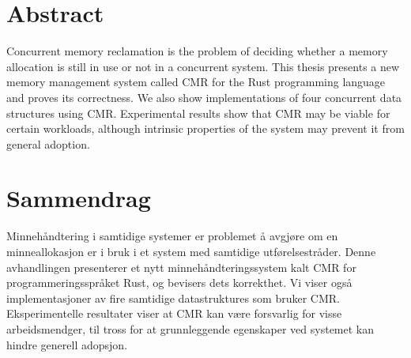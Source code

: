 \par\break\null%
\vsize%
{\centering\section*{Abstract}}

Concurrent memory reclamation is the problem of deciding whether a memory allocation is still in
use or not in a concurrent system.  This thesis presents a new memory management system called CMR
for the Rust programming language and proves its correctness.  We also show implementations of four
concurrent data structures using CMR\@.  Experimental results show that CMR may be viable for
certain workloads, although intrinsic properties of the system may prevent it from general
adoption.


\vfill%
{\centering\section*{Sammendrag}}

Minnehåndtering i samtidige systemer er problemet å avgjøre om en minneallokasjon er i bruk i et
system med samtidige utførelsestråder. Denne avhandlingen presenterer et nytt
minnehåndteringssystem kalt CMR for programmeringsspråket Rust, og bevisers dets korrekthet. Vi
viser også implementasjoner av fire samtidige datastruktures som bruker CMR\@. Eksperimentelle
resultater viser at CMR kan være forsvarlig for visse arbeidsmendger, til tross for at
grunnleggende egenskaper ved systemet kan hindre generell adopsjon.

\vfill\break%
